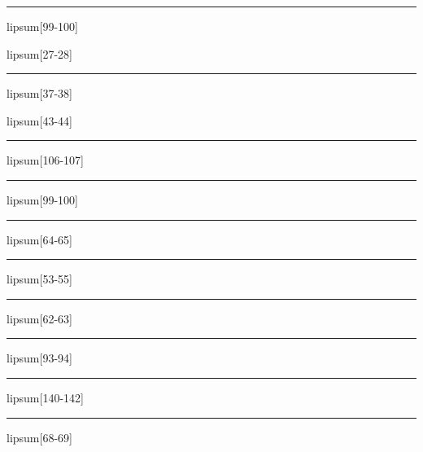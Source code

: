 \documentclass[11pt,a4paper]{article}
\begin{document}
\begin{simplewrap}
  \textcolor{orange!37}{\rule{5.1cm}{5.8cm}}
\end{simplewrap}
lipsum[99-100]

lipsum[27-28]

\begin{simplewrap}
  \textcolor{brown!33}{\rule{5.6cm}{3.1cm}}
\end{simplewrap}
lipsum[37-38]

lipsum[43-44]

\begin{simplewrap}
  \textcolor{blue!32}{\rule{5.2cm}{7.0cm}}
\end{simplewrap}
lipsum[106-107]

\begin{simplewrap}
  \textcolor{blue!23}{\rule{3.3cm}{2.8cm}}
\end{simplewrap}
lipsum[99-100]

\begin{simplewrap}
  \textcolor{olive!30}{\rule{5.4cm}{4.0cm}}
\end{simplewrap}
lipsum[64-65]

\begin{simplewrap}
  \textcolor{violet!59}{\rule{5.8cm}{2.2cm}}
\end{simplewrap}
lipsum[53-55]

\begin{simplewrap}
  \textcolor{cyan!22}{\rule{5.2cm}{4.4cm}}
\end{simplewrap}
lipsum[62-63]

\begin{simplewrap}
  \textcolor{orange!25}{\rule{4.5cm}{6.8cm}}
\end{simplewrap}
lipsum[93-94]

\begin{simplewrap}
  \textcolor{purple!34}{\rule{5.6cm}{6.5cm}}
\end{simplewrap}
lipsum[140-142]

\begin{simplewrap}
  \textcolor{red!59}{\rule{3.2cm}{6.7cm}}
\end{simplewrap}
lipsum[68-69]
\end{document}
